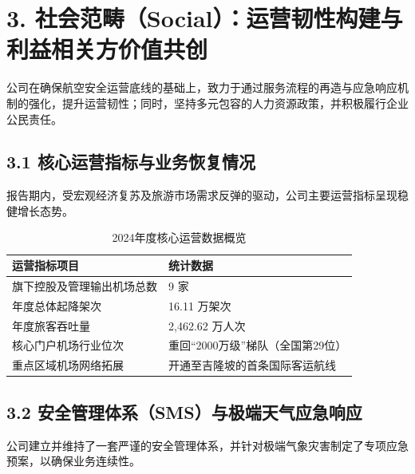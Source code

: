 \documentclass[a4paper,12pt]{article}
\begin{document}
\section{3. 社会范畴（Social）：运营韧性构建与利益相关方价值共创}

公司在确保航空安全运营底线的基础上，致力于通过服务流程的再造与应急响应机制的强化，提升运营韧性；同时，坚持多元包容的人力资源政策，并积极履行企业公民责任。

\subsection{3.1 核心运营指标与业务恢复情况}

报告期内，受宏观经济复苏及旅游市场需求反弹的驱动，公司主要运营指标呈现稳健增长态势。

\begin{table}[H]
    \centering
    \caption{2024年度核心运营数据概览}
    \label{tab:ops_data}
    \renewcommand{\arraystretch}{1.3}
    \begin{tabular}{p{8cm} p{5cm}}
        \toprule
        \textbf{运营指标项目} & \textbf{统计数据} \\
        \midrule
        旗下控股及管理输出机场总数 & 9 家 \\
        年度总体起降架次 & 16.11 万架次 \\
        年度旅客吞吐量 & 2,462.62 万人次 \\
        核心门户机场行业位次 & 重回“2000万级”梯队（全国第29位） \\
        重点区域机场网络拓展 & 开通至吉隆坡的首条国际客运航线 \\
        \bottomrule
    \end{tabular}
\end{table}

\subsection{3.2 安全管理体系（SMS）与极端天气应急响应}

公司建立并维持了一套严谨的安全管理体系，并针对极端气象灾害制定了专项应急预案，以确保业务连续性。
\end{document}
